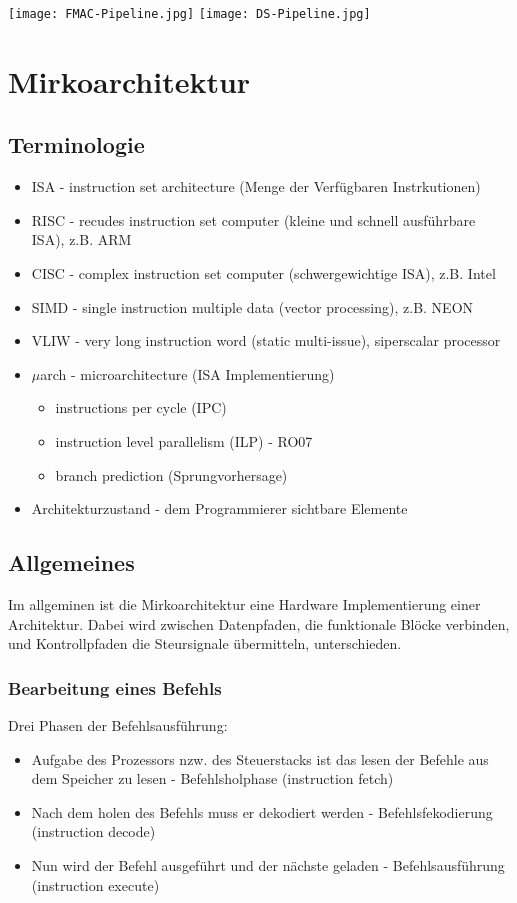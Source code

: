 		\texttt{[image: FMAC-Pipeline.jpg]}
		\texttt{[image: DS-Pipeline.jpg]}



\newpage
\section{Mirkoarchitektur}
	\subsection{Terminologie}
		\begin{itemize}
			\item ISA - instruction set architecture (Menge der Verfügbaren Instrkutionen)
			\item RISC - recudes instruction set computer (kleine und schnell ausführbare ISA), z.B. ARM
			\item CISC - complex instruction set computer (schwergewichtige ISA), z.B. Intel
			\item SIMD - single instruction multiple data (vector processing), z.B. NEON
			\item VLIW - very long instruction word (static multi-issue), siperscalar processor
			\item $\mu$arch - microarchitecture (ISA Implementierung)
				\begin{itemize}
					\item instructions per cycle (IPC)
					\item instruction level parallelism (ILP) - RO07
					\item branch prediction (Sprungvorhersage)
				\end{itemize}
				\item Architekturzustand - dem Programmierer sichtbare Elemente
		\end{itemize}


	\vspace{0.8cm}
	\subsection{Allgemeines}
		Im allgeminen ist die Mirkoarchitektur eine Hardware Implementierung einer Architektur.
		Dabei wird zwischen Datenpfaden, die funktionale Blöcke verbinden, und Kontrollpfaden die Steursignale
		übermitteln, unterschieden.

		\subsubsection{Bearbeitung eines Befehls}
		Drei Phasen der Befehlsausführung:
		\begin{itemize}
			\item Aufgabe des Prozessors nzw. des Steuerstacks ist das lesen der 
				Befehle aus dem Speicher zu lesen - Befehlsholphase (instruction fetch)
			\item Nach dem holen des Befehls muss er dekodiert werden - Befehlsfekodierung (instruction decode)
			\item Nun wird der Befehl ausgeführt und der nächste geladen - Befehlsausführung (instruction execute)
		\end{itemize}


